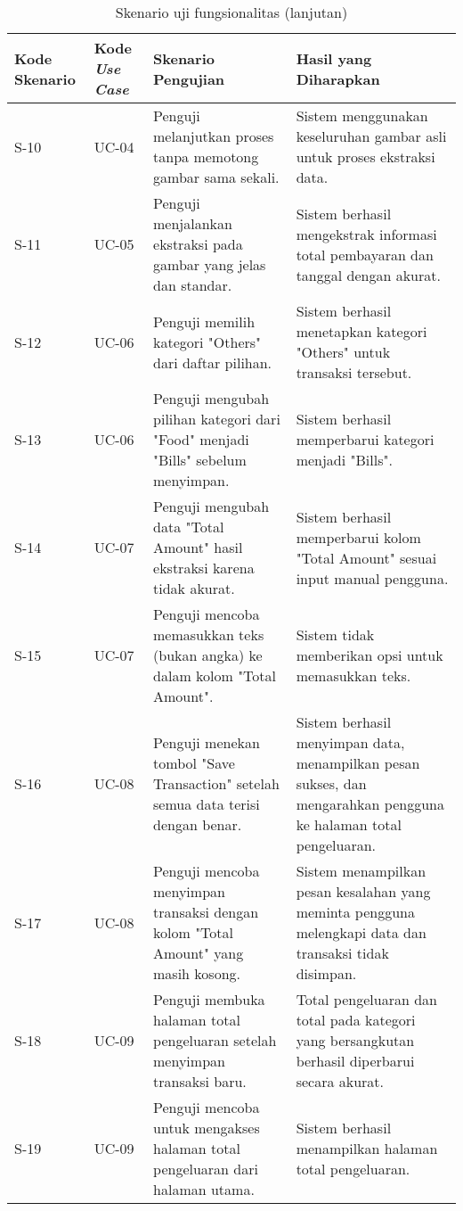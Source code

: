 \begin{table}[h!]
\ContinuedFloat
\caption{Skenario uji fungsionalitas (lanjutan)}
\begin{tabularx}{\linewidth}{|p{1.5cm}|p{1.5cm}|p{4.5cm}|X|}
\hline
\textbf{Kode Skenario} & \textbf{Kode \emph{Use Case}} & \textbf{Skenario Pengujian} & \textbf{Hasil yang Diharapkan} \\
\hline
S-10 & UC-04 & Penguji melanjutkan proses tanpa memotong gambar sama sekali. & Sistem menggunakan keseluruhan gambar asli untuk proses ekstraksi data. \\
\hline
S-11 & UC-05 & Penguji menjalankan ekstraksi pada gambar yang jelas dan standar. & Sistem berhasil mengekstrak informasi total pembayaran dan tanggal dengan akurat. \\
\hline
S-12 & UC-06 & Penguji memilih kategori "Others" dari daftar pilihan. & Sistem berhasil menetapkan kategori "Others" untuk transaksi tersebut. \\
\hline
S-13 & UC-06 & Penguji mengubah pilihan kategori dari "Food" menjadi "Bills" sebelum menyimpan. & Sistem berhasil memperbarui kategori menjadi "Bills". \\
\hline
S-14 & UC-07 & Penguji mengubah data "Total Amount" hasil ekstraksi karena tidak akurat. & Sistem berhasil memperbarui kolom "Total Amount" sesuai input manual pengguna. \\
\hline
S-15 & UC-07 & Penguji mencoba memasukkan teks (bukan angka) ke dalam kolom "Total Amount". & Sistem tidak memberikan opsi untuk memasukkan teks. \\
\hline
S-16 & UC-08 & Penguji menekan tombol "Save Transaction" setelah semua data terisi dengan benar. & Sistem berhasil menyimpan data, menampilkan pesan sukses, dan mengarahkan pengguna ke halaman total pengeluaran. \\
\hline
S-17 & UC-08 & Penguji mencoba menyimpan transaksi dengan kolom "Total Amount" yang masih kosong. & Sistem menampilkan pesan kesalahan yang meminta pengguna melengkapi data dan transaksi tidak disimpan. \\
\hline
S-18 & UC-09 & Penguji membuka halaman total pengeluaran setelah menyimpan transaksi baru. & Total pengeluaran dan total pada kategori yang bersangkutan berhasil diperbarui secara akurat. \\
\hline
S-19 & UC-09 & Penguji mencoba untuk mengakses halaman total pengeluaran dari halaman utama. & Sistem berhasil menampilkan halaman total pengeluaran. \\
\hline
\end{tabularx}
\end{table}

